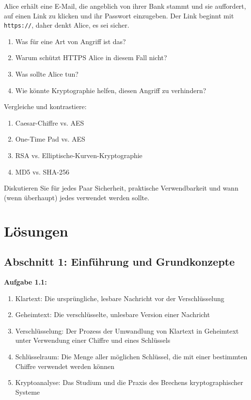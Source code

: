 \documentclass[11pt,a4paper]{report}
\begin{document}
\begin{ex}
Alice erhält eine E-Mail, die angeblich von ihrer Bank stammt und sie auffordert, auf einen Link zu klicken und ihr Passwort einzugeben. Der Link beginnt mit \texttt{https://}, daher denkt Alice, es sei sicher.

\begin{enumerate}[label=\alph*)]
    \item Was für eine Art von Angriff ist das?
    \item Warum schützt HTTPS Alice in diesem Fall nicht?
    \item Was sollte Alice tun?
    \item Wie könnte Kryptographie helfen, diesen Angriff zu verhindern?
\end{enumerate}
\end{ex}

\begin{ex}
Vergleiche und kontrastiere:
\begin{enumerate}[label=\alph*)]
    \item Caesar-Chiffre vs. AES
    \item One-Time Pad vs. AES
    \item RSA vs. Elliptische-Kurven-Kryptographie
    \item MD5 vs. SHA-256
\end{enumerate}

Diskutieren Sie für jedes Paar Sicherheit, praktische Verwendbarkeit und wann (wenn überhaupt) jedes verwendet werden sollte.
\end{ex}

\newpage
\section*{Lösungen}

\subsection*{Abschnitt 1: Einführung und Grundkonzepte}

\textbf{Aufgabe 1.1:}
\begin{enumerate}[label=\alph*)]
    \item Klartext: Die ursprüngliche, lesbare Nachricht vor der Verschlüsselung
    \item Geheimtext: Die verschlüsselte, unlesbare Version einer Nachricht
    \item Verschlüsselung: Der Prozess der Umwandlung von Klartext in Geheimtext unter Verwendung einer Chiffre und eines Schlüssels
    \item Schlüsselraum: Die Menge aller möglichen Schlüssel, die mit einer bestimmten Chiffre verwendet werden können
    \item Kryptoanalyse: Das Studium und die Praxis des Brechens kryptographischer Systeme
\end{enumerate}
\end{document}
